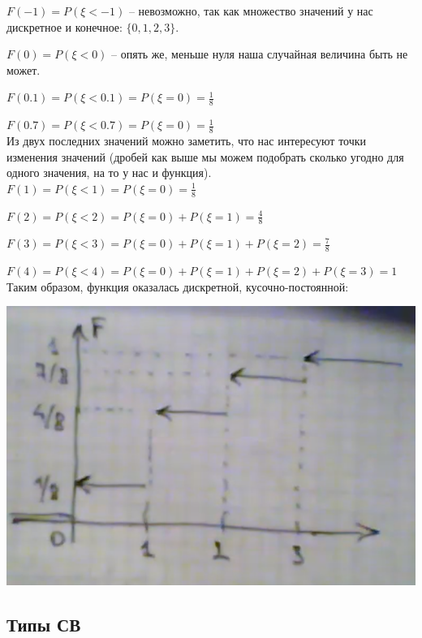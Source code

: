 \documentclass{article}
\begin{document}
$F(-1) = P(\xi < -1)$ -- невозможно, так как множество значений у нас дискретное и конечное: $\{0, 1, 2, 3\} $.

$F(0) = P(\xi < 0)$ -- опять же, меньше нуля наша случайная величина быть не может.

$F(0.1) = P(\xi < 0.1) = P(\xi = 0) = \frac{1}{8}$

$F(0.7) = P(\xi < 0.7) = P(\xi = 0) = \frac{1}{8}$
\\

Из двух последних значений можно заметить, что нас интересуют точки изменения значений (дробей как выше мы можем подобрать сколько угодно для одного значения, на то у нас и функция).
\\

$F(1) = P(\xi < 1) = P(\xi = 0) = \frac{1}{8}$

$F(2) = P(\xi < 2) = P(\xi = 0) + P(\xi = 1) = \frac{4}{8}$

$F(3) = P(\xi < 3) = P(\xi = 0) + P(\xi = 1) + P(\xi = 2) = \frac{7}{8}$

$F(4) = P(\xi < 4) = P(\xi = 0) + P(\xi = 1) + P(\xi = 2) + P(\xi = 3) = 1$
\\

Таким образом, функция оказалась дискретной, кусочно-постоянной:

\begin{center}
    \includegraphics[scale=0.6]{5.png}
\end{center}

\subsection{Типы СВ}
\end{document}
